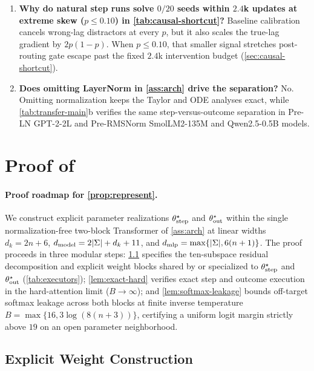 \begin{enumerate}[label=\textbf{Q\arabic*.},leftmargin=*,itemsep=3pt,topsep=3pt]
\item \textbf{Why do natural step runs solve $0/20$ seeds within $2.4$k updates at extreme skew ($p \le 0.10$) in \cref{tab:causal-shortcut}?}
Baseline calibration cancels wrong-lag distractors at every $p$, but it also scales the true-lag gradient by $2p(1-p)$. When $p \le 0.10$, that smaller signal stretches post-routing gate escape past the fixed $2.4$k intervention budget (\cref{sec:causal-shortcut}).

\item \textbf{Does omitting LayerNorm in \cref{ass:arch} drive the separation?}
No. Omitting normalization keeps the Taylor and ODE analyses exact, while \cref{tab:transfer-main}b verifies the same step-versus-outcome separation in Pre-LN GPT-2-2L and Pre-RMSNorm SmolLM2-135M and Qwen2.5-0.5B models.
\end{enumerate}

\section{Proof of \texorpdfstring{}{Proposition 1}}
\label{app:architectures}
\label{app:construction}
\label{app:model}

\paragraph{Proof roadmap for \cref{prop:represent}.}
We construct explicit parameter realizations $\theta^\star_{\mathrm{step}}$ and $\theta^\star_{\mathrm{out}}$ within the single normalization-free two-block Transformer of \cref{ass:arch} at linear widths $d_k = 2n+6$, $d_{\mathrm{model}} = 2|\Sigma| + d_k + 11$, and $d_{\mathrm{mlp}} = \max\{|\Sigma|, 6(n+1)\}$. The proof proceeds in three modular steps: \cref{app:subspace-construction} specifies the ten-subspace residual decomposition and explicit weight blocks shared by or specialized to $\theta^\star_{\mathrm{step}}$ and $\theta^\star_{\mathrm{out}}$ (\cref{tab:executors}); \cref{lem:exact-hard} verifies exact step and outcome execution in the hard-attention limit ($B \to \infty$); and \cref{lem:softmax-leakage} bounds off-target softmax leakage across both blocks at finite inverse temperature $B = \max\{16, 3\log(8(n+3))\}$, certifying a uniform logit margin strictly above $19$ on an open parameter neighborhood.

\subsection{Explicit Weight Construction}
\label{app:subspace-construction}

